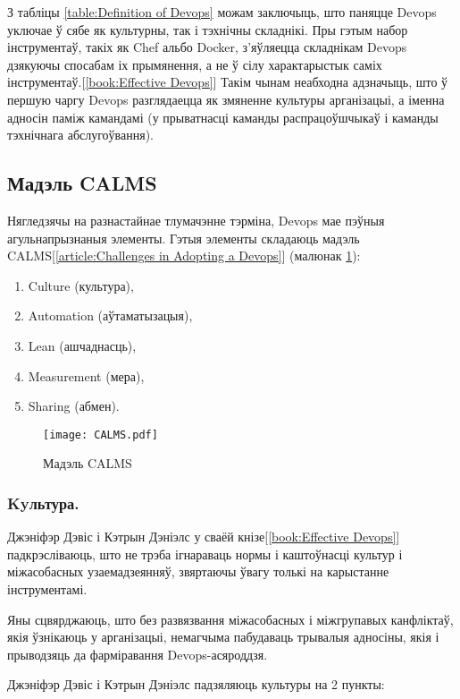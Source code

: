 З табліцы \ref{table:Definition of Devops} можам заключыць,
што паняцце Devops уключае ў сябе як культурны, так і
тэхнічны складнікі.
Пры гэтым набор інструментаў, такіх як Chef альбо Docker,
з'яўляецца складнікам Devops дзякуючы спосабам іх прымянення,
а не ў сілу характарыстык саміх інструментаў.[\ref{book:Effective Devops}]
Такім чынам неабходна адзначыць, што ў першую чаргу Devops разглядаецца
як змяненне культуры арганізацыі,
а іменна адносін паміж камандамі (у прыватнасці каманды распрацоўшчыкаў і
каманды тэхнічнага абслугоўвання).

\subsection{Мадэль CALMS}

Нягледзячы на разнастайнае тлумачэнне тэрміна, Devops мае
пэўныя агульнапрызнаныя элементы.
Гэтыя элементы складаюць мадэль CALMS[\ref{article:Challenges in Adopting a Devops}] (малюнак \ref{fig:CALMS model}):
\begin{enumerate}
    \item Culture (культура),
    \item Automation (аўтаматызацыя),
    \item Lean (ашчаднасць),
    \item Measurement (мера),
    \item Sharing (абмен).
\end{enumerate}

\begin{figure}[h!]
    \texttt{[image: CALMS.pdf]}
    \caption{Мадэль CALMS}
    \label{fig:CALMS model}
\end{figure}

\vspace{-\baselineskip}
\subsubsection{Kyльтура.}

Джэніфэр Дэвіс і Кэтрын Дэніэлс у сваёй кнізе[\ref{book:Effective Devops}]
падкрэсліваюць, што не трэба ігнараваць нормы і каштоўнасці
культур і міжасобасных узаемадзеянняў, звяртаючы ўвагу толькі
на карыстанне інструментамі.

Яны сцвярджаюць, што без развязвання міжасобасных і
міжгрупавых канфліктаў, якія ўзнікаюць у арганізацыі,
немагчыма пабудаваць трывалыя адносіны, якія і прыводзяць
да фар\-мі\-ра\-ван\-ня Devops-асяроддзя.

Джэніфэр Дэвіс і Кэтрын Дэніэлс падзяляюць культуры на 2 пункты:

